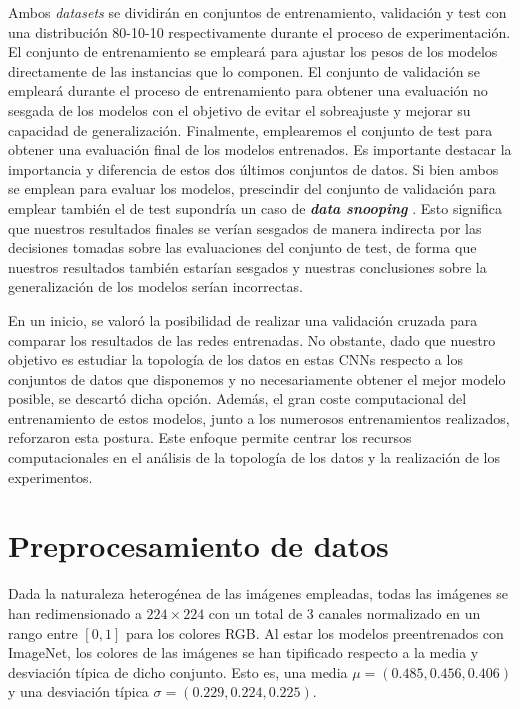  Ambos \textit{datasets} se dividirán en conjuntos de entrenamiento, validación y test con una distribución 80-10-10 respectivamente durante el proceso de experimentación. El conjunto de entrenamiento se empleará para ajustar los pesos de los modelos directamente de las instancias que lo componen. El conjunto de validación se empleará durante el proceso de entrenamiento para obtener una evaluación no sesgada de los modelos con el objetivo de evitar el sobreajuste y mejorar su capacidad de generalización. Finalmente, emplearemos el conjunto de test para obtener una evaluación final de los modelos entrenados. Es importante destacar la importancia y diferencia de estos dos últimos conjuntos de datos. Si bien ambos se emplean para evaluar los modelos, prescindir del conjunto de validación para emplear también el de test supondría un caso de \textbf{\textit{data snooping}} \cite{white2000reality}. Esto significa que nuestros resultados finales se verían sesgados de manera indirecta por las decisiones tomadas sobre las evaluaciones del conjunto de test, de forma que nuestros resultados también estarían sesgados y nuestras conclusiones sobre la generalización de los modelos serían incorrectas.

En un inicio, se valoró la posibilidad de realizar una validación cruzada para comparar los resultados de las redes entrenadas. No obstante, dado que nuestro objetivo es estudiar la topología de los datos en estas CNNs respecto a los conjuntos de datos que disponemos y no necesariamente obtener el mejor modelo posible, se descartó dicha opción. Además, el gran coste computacional del entrenamiento de estos modelos, junto a los numerosos entrenamientos realizados, reforzaron esta postura. Este enfoque permite centrar los recursos computacionales en el análisis de la topología de los datos y la realización de los experimentos.

\section{Preprocesamiento de datos} \label{sec:data-aug}

Dada la naturaleza heterogénea de las imágenes empleadas, todas las imágenes se han redimensionado a $224 \times 224$ con un total de $3$ canales normalizado en un rango entre $[0,1]$ para los colores RGB. Al estar los modelos preentrenados con ImageNet, los colores de las imágenes se han tipificado respecto a la media y desviación típica de dicho conjunto. Esto es, una media $\mu = (0.485, 0.456, 0.406)$ y una desviación típica $\sigma = (0.229, 0.224, 0.225)$.

